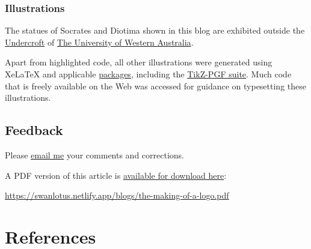\documentclass[
  a4paper,
]{article}
\begin{document}
\hypertarget{illustrations}{%
\subsubsection{Illustrations}\label{illustrations}}

The statues of Socrates and Diotima shown in this blog are exhibited
outside the
\href{https://www.uwa.edu.au/theatres/venues/undercroft}{Undercroft} of
\href{https://www.uwa.edu.au/}{The University of Western Australia}.

Apart from highlighted code, all other illustrations were generated
using XeLaTeX and applicable
\href{https://ctan.org/pkg?lang=en}{packages}, including the
\href{https://github.com/pgf-tikz/pgf}{TikZ-PGF suite}. Much code that
is freely available on the Web was accessed for guidance on typesetting
these illustrations.

\hypertarget{feedback}{%
\subsection{Feedback}\label{feedback}}

Please \href{mailto:feedback.swanlotus@gmail.com}{email me} your
comments and corrections.

\noindent A PDF version of this article is
\href{./the-making-of-a-logo.pdf}{available for download here}:

\begin{normalsize}

\begin{ttfamily}

\url{https://swanlotus.netlify.app/blogs/the-making-of-a-logo.pdf}

\end{ttfamily}

\end{normalsize}

\hypertarget{bibliography}{%
\section*{References}\label{bibliography}}
\end{document}
